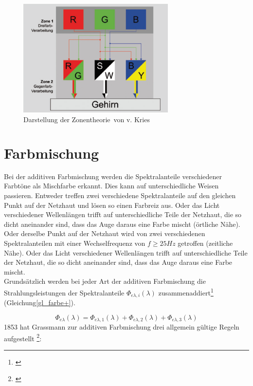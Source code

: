 \begin{figure}[H]     %
\centering
\includegraphics[width=0.7\textwidth]{bilder/zonen} 
\caption {Darstellung der \glqq Zonentheorie\grqq\ von v. Kries \protect\footnotemark}\label{b_zonen}
\end{figure}

\section{Farbmischung} \label{sec_farbmischung}

Bei der additiven Farbmischung werden die Spektralanteile verschiedener Farbtöne als Mischfarbe erkannt. Dies kann auf unterschiedliche Weisen passieren. Entweder treffen zwei verschiedene Spektralanteile auf den gleichen Punkt auf der Netzhaut und lösen so einen Farbreiz aus. Oder das Licht verschiedener Wellenlängen trifft auf unterschiedliche Teile der Netzhaut, die so dicht aneinander sind, dass das Auge daraus eine Farbe mischt (örtliche Nähe). Oder derselbe Punkt auf der Netzhaut wird von zwei verschiedenen Spektralanteilen mit einer Wechselfrequenz von $f\geq25Hz$ getroffen (zeitliche Nähe). Oder das Licht verschiedener Wellenlängen trifft auf unterschiedliche Teile der Netzhaut, die so dicht aneinander sind, dass das Auge daraus eine Farbe mischt.\\
Grundsätzlich werden bei jeder Art der additiven Farbmischung die Strahlungsleistungen der Spektralanteile $\Phi_{e\lambda,i}(\lambda)$ zusammenaddiert\footnote{\cite[83]{greule}} (Gleichung\ref{gl_farbe+}).

	\begin{equation}\label{gl_farbe+}
		\Phi_{e\lambda}(\lambda) = \Phi_{e\lambda,1}(\lambda) + \Phi_{e\lambda,2}(\lambda) + \Phi_{e\lambda,3}(\lambda)
	\end{equation}
1853 hat Grassmann zur additiven Farbmischung drei allgemein gültige Regeln aufgestellt \footnote{\cite[105]{hentschel}}: 

